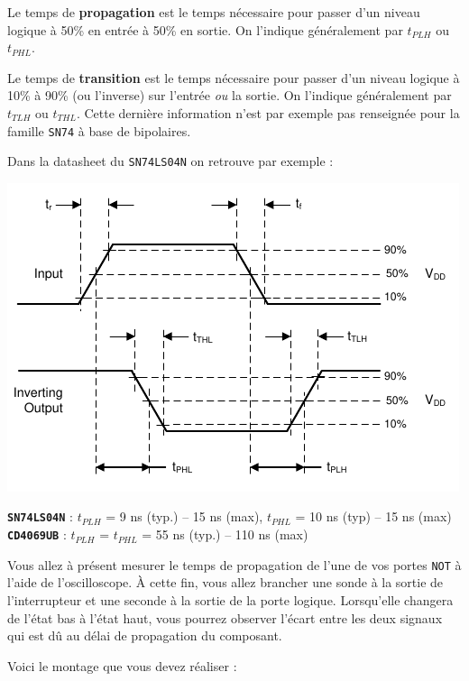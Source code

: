 \documentclass{../template/labo}
\begin{document}
{
	Le temps de \textbf{propagation} est le temps nécessaire pour passer d'un niveau logique à 50\% en entrée à 50\% en sortie. On l'indique généralement par $t_{PLH}$ ou $t_{PHL}$.

	Le temps de \textbf{transition} est le temps nécessaire pour passer d'un niveau logique à 10\% à 90\% (ou l'inverse) sur l'entrée \textit{ou} la sortie. On l'indique généralement par $t_{TLH}$ ou $t_{THL}$.
	Cette dernière information n'est par exemple pas renseignée pour la famille \texttt{SN74} à base de bipolaires.

	Dans la datasheet du \texttt{SN74LS04N} on retrouve par exemple :
	\begin{center}
	\includegraphics[width=.5\textwidth]{sn74ls04n-delays-graph.png}
	\end{center}


	\textbf{\texttt{SN74LS04N}} : $t_{PLH}$ = 9 ns (typ.) -- 15 ns (max), $t_{PHL}$ = 10 ns (typ) -- 15 ns (max)
	\textbf{\texttt{CD4069UB}} : $t_{PLH}$ = $t_{PHL}$ = 55 ns (typ.) -- 110 ns (max)

	
}



Vous allez à présent mesurer le temps de propagation de l'une de vos portes \texttt{NOT} à l'aide de l'oscilloscope.
À cette fin, vous allez brancher une sonde à la sortie de l'interrupteur et une seconde à la sortie de la porte logique.
Lorsqu'elle changera de l'état bas à l'état haut, vous pourrez observer l'écart entre les deux signaux qui est dû au délai de propagation du composant.

Voici le montage que vous devez réaliser :
\end{document}
